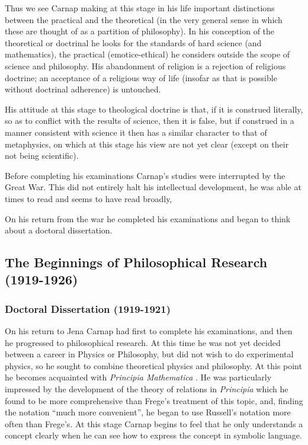 \documentclass[10pt,titlepage]{book}
\begin{document}
Thus we see Carnap making at this stage in his life important distinctions between the practical and the theoretical (in the very general sense in which these are thought of as a partition of philosophy).
In his conception of the theoretical or doctrinal he looks for the standards of hard science (and mathematics), the practical (emotice-ethical) he considers outside the scope of science and philosophy.
His abandonment of religion is a rejection of religious doctrine; an acceptance of a religious way of life (insofar as that is possible without doctrinal adherence) is untouched.

His attitude at this stage to theological doctrine is that, if it is construed literally, so as to conflict with the results of science, then it is false, but if construed in a manner consistent with science it then has a similar character to that of metaphysics, on which at this stage his view are not yet clear (except on their not being scientific).

Before completing his examinations Carnap's studies were interrupted by the Great War.
This did not entirely halt his intellectual development, he was able at times to read and seems to have read broadly,

On his return from the war he completed his examinations and began to think about a doctoral dissertation.

\subsection{The Beginnings of Philosophical Research (1919-1926)}

\subsubsection{Doctoral Dissertation (1919-1921)}

On his return to Jena Carnap had first to complete his examinations, and then he progressed to philosophical research.
At this time he was not yet decided between a career in Physics or Philosophy, but did not wish to do experimental physics, so he sought to combine theoretical physics and philosophy.
At this point he becomes acquainted with \emph{Principia Mathematica} \cite{russell10}.
He was particularly impressed by the development of the theory of relations in \emph{Principia} which he found to be more comprehensive than Frege's treatment of this topic, and, finding the notation ``much more convenient'', he began to use Russell's notation more often than Frege's.
At this stage Carnap begins to feel that he only understands a concept clearly when he can see how to express the concept in symbolic language.
\end{document}
